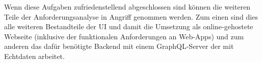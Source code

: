 Wenn diese Aufgaben zufriedenstellend abgeschlossen sind können die weiteren Teile der Anforderungsanalyse in Angriff genommen werden. Zum einen sind dies alle weiteren Bestandteile der UI und damit die Umsetzung als online-gehostete Webseite (inklusive der funktionalen Anforderungen an Web-Apps) und zum anderen das dafür benötigte Backend mit einem GraphQL-Server der mit Echtdaten arbeitet.
